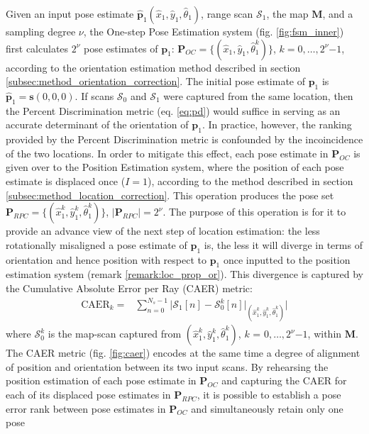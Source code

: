 Given an input pose estimate $\hat{\bm{p}}_1(\hat{x}_1, \hat{y}_1,
\hat{\theta}_1)$, range scan $\mathcal{S}_1$, the map $\bm{M}$, and a sampling
degree $\nu$, the One-step Pose Estimation system (fig. \ref{fig:fsm_inner})
first calculates $2^\nu$ pose estimates of $\bm{p}_1$: $\bm{P}_{OC} =
\{(\hat{x}_1, \hat{y}_1, \hat{\theta}_1^k)\}$, $k = 0,\dots,2^\nu$$-$$1$,
according to the orientation estimation method described in section
\ref{subsec:method_orientation_correction}. The initial pose estimate of
$\bm{p}_1$ is $\hat{\bm{p}}_1 = \bm{s}(0,0,0)$.
If scans $\mathcal{S}_0$ and $\mathcal{S}_1$ were captured from the same
location, then the Percent Discrimination metric (eq. \ref{eq:pd}) would
suffice in serving as an accurate determinant of the orientation of $\bm{p}_1$.
In practice, however, the ranking provided by the Percent Discrimination metric
is confounded by the incoincidence of the two locations. In order to mitigate
this effect, each pose estimate in $\bm{P}_{OC}$ is given over to the Position
Estimation system, where the position of each pose estimate is displaced once
($I=1$), according to the method described in section
\ref{subsec:method_location_correction}.  This operation produces the pose set
$\bm{P}_{RPC} = \{(\hat{x}_1^k, \hat{y}_1^k, \hat{\theta}_1^k)\}$,
$|\bm{P}_{RPC}| = 2^\nu$. The purpose of this operation is for it to provide an
advance view of the next step of location estimation: the less rotationally
misaligned a pose estimate of $\bm{p}_1$ is, the less it will diverge in terms
of orientation and hence position with respect to $\bm{p}_1$ once inputted to
the position estimation system (remark \ref{remark:loc_prop_or}). This
divergence is captured by the Cumulative Absolute Error per Ray (CAER) metric:
\begin{align}
  \text{CAER}_k = & \sum\limits_{n=0}^{N_s-1} \Bigg| \mathcal{S}_1[n] - \mathcal{S}_0^k[n]\Big|_{(\hat{x}_1^k, \hat{y}_1^k, \hat{\theta}_1^k)} \Bigg|
  \label{eq:caer}
\end{align}
where $\mathcal{S}_0^k$ is the map-scan captured from
$(\hat{x}_1^k, \hat{y}_1^k, \hat{\theta}_1^k)$, $k$ = $0,\dots,2^\nu$$-$$1$,
within $\bm{M}$. The CAER metric (fig. \ref{fig:caer})
encodes at the same time a degree of alignment of position and orientation
between its two input scans. By rehearsing the position estimation of each pose
estimate in $\bm{P}_{OC}$ and capturing the CAER for each of its displaced pose
estimates in $\bm{P}_{RPC}$, it is possible to establish a pose error rank
between pose estimates in $\bm{P}_{OC}$ and simultaneously retain only one pose
